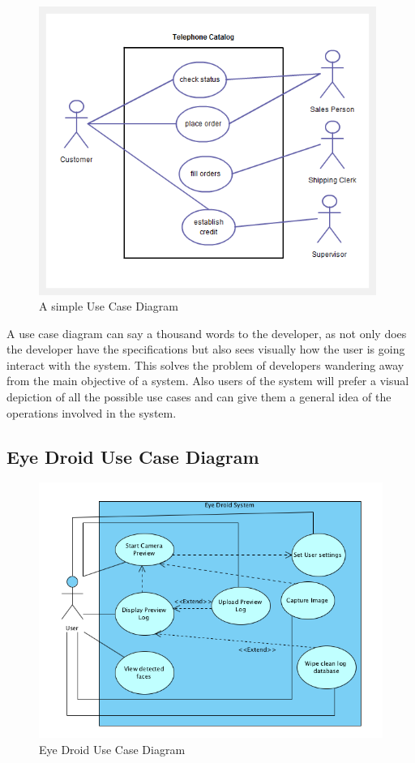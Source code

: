\begin{figure}[ht!]
\centering
\includegraphics[width=110mm]{usecase_diagram.png}
\caption{A simple Use Case Diagram}
\label{overflow}
\end{figure}

A use case diagram can say a thousand words to the developer, as not only does the developer have the specifications but also sees visually how the user is going interact with the system. This solves the problem of developers wandering away from the main objective of a system. Also users of the system will prefer a visual depiction of all the possible use cases and can give them a general idea of the operations involved in the system.
\newpage
\subsection{Eye Droid Use Case Diagram}

\begin{figure}[ht!]
\centering
\includegraphics[width=150mm]{eye_droid_usecase_diagram.png}
\caption{Eye Droid Use Case Diagram}
\label{overflow}
\end{figure}   

